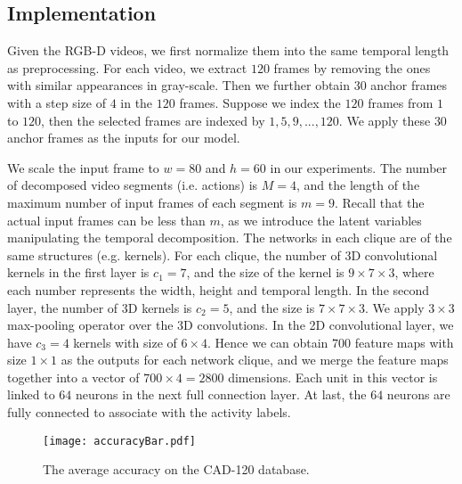 \documentclass{sig-alternate}
\begin{document}
\subsection{Implementation}

Given the RGB-D videos, we first normalize them into the same temporal length as preprocessing.  For each video, we extract $120$ frames by removing the ones with similar appearances in gray-scale. Then we further obtain $30$ anchor frames with a step size of $4$ in the $120$ frames. Suppose we index the $120$ frames from $1$ to $120$, then the selected frames are indexed by $1,5,9,...,120$. We apply these $30$ anchor frames as the inputs for our model.


We scale the input frame to $w = 80$ and $h = 60$ in our experiments. The number of decomposed video segments (i.e. actions) is $M=4$, and the length of the maximum number of input frames of each segment is $m=9$. Recall that the actual input frames can be less than $m$, as we introduce the latent variables manipulating the temporal decomposition. The networks in each clique are of the same structures (e.g. kernels). For each clique, the number of 3D convolutional kernels in the first layer is $c_1=7$, and the size of the kernel is $9 \times 7 \times 3$, where each number represents the width, height and temporal length. In the second layer, the number of 3D kernels is $c_2=5$, and the size is $7 \times 7 \times 3$. We apply $3 \times 3$ max-pooling operator over the 3D convolutions. In the 2D convolutional layer, we have $c_3=4$ kernels with size of $6 \times 4$. Hence we can obtain $700$ feature maps with size $1 \times 1$ as the outputs for each network clique, and we merge the feature maps  together into a vector of $700 \times 4 = 2800$ dimensions. Each unit in this vector is linked to $64$ neurons in the next full connection layer. At last, the $64$ neurons are fully connected to associate with the activity labels.

\begin{figure}[!htb]
\centering
\texttt{[image: accuracyBar.pdf]}
\caption{The average accuracy on the CAD-120 database.}\label{fig:CAD_results}
\end{figure}
\end{document}
